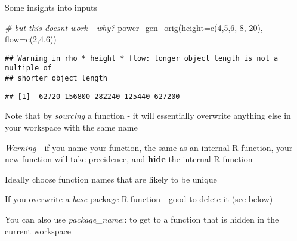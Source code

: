 \documentclass[
  ignorenonframetext,
]{beamer}
\newenvironment{Shaded}{\begin{snugshade}}{\end{snugshade}}
\newcommand{\AttributeTok}[1]{\textcolor[rgb]{0.77,0.63,0.00}{#1}}
\newcommand{\CommentTok}[1]{\textcolor[rgb]{0.56,0.35,0.01}{\textit{#1}}}
\newcommand{\DecValTok}[1]{\textcolor[rgb]{0.00,0.00,0.81}{#1}}
\newcommand{\FunctionTok}[1]{\textcolor[rgb]{0.00,0.00,0.00}{#1}}
\newcommand{\NormalTok}[1]{#1}
\begin{document}
\begin{frame}[fragile]{Some insights into inputs}
\begin{Shaded}
\begin{Highlighting}[]
\CommentTok{\# but this doesn\textquotesingle{}t work {-} why?}
\FunctionTok{power\_gen\_orig}\NormalTok{(}\AttributeTok{height=}\FunctionTok{c}\NormalTok{(}\DecValTok{4}\NormalTok{,}\DecValTok{5}\NormalTok{,}\DecValTok{6}\NormalTok{, }\DecValTok{8}\NormalTok{, }\DecValTok{20}\NormalTok{), }\AttributeTok{flow=}\FunctionTok{c}\NormalTok{(}\DecValTok{2}\NormalTok{,}\DecValTok{4}\NormalTok{,}\DecValTok{6}\NormalTok{))}
\end{Highlighting}
\end{Shaded}

\begin{verbatim}
## Warning in rho * height * flow: longer object length is not a multiple of
## shorter object length
\end{verbatim}

\begin{verbatim}
## [1]  62720 156800 282240 125440 627200
\end{verbatim}
\end{frame}

\begin{frame}{}
\protect\hypertarget{section}{}
Note that by \emph{sourcing} a function - it will essentially overwrite
anything else in your workspace with the same name

\emph{Warning} - if you name your function, the same as an internal R
function, your new function will take precidence, and \textbf{hide} the
internal R function

Ideally choose function names that are likely to be unique

If you overwrite a \emph{base} package R function - good to delete it
(see below)

You can also use \emph{package\_name}:: to get to a function that is
hidden in the current workspace
\end{frame}
\end{document}

